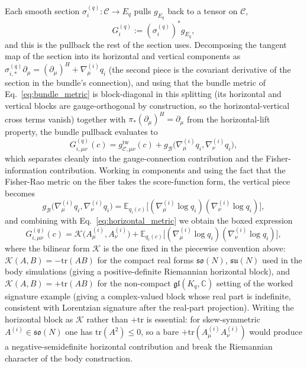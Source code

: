 \documentclass[11pt]{article}
\begin{document}
Each smooth section $\sigma_i^{(q)}: \mathcal{C} \to E_q$ pulls $g_{E_q}$ back to a tensor on $\mathcal{C}$,
\begin{equation}
G_i^{(q)} := (\sigma_i^{(q)})^* g_{E_q},
\end{equation}
and this is the pullback the rest of the section uses. Decomposing the tangent map of the section into its horizontal and vertical components as $\sigma_{i,*}^{(q)}\partial_\mu = (\partial_\mu)^H + \nabla^{(i)}_\mu q_i$ (the second piece is the covariant derivative of the section in the bundle's connection), and using that the bundle metric of Eq.~\eqref{eq:bundle_metric} is block-diagonal in this splitting (its horizontal and vertical blocks are gauge-orthogonal by construction, so the horizontal-vertical cross terms vanish) together with $\pi_*(\partial_\mu)^H = \partial_\mu$ from the horizontal-lift property, the bundle pullback evaluates to
\begin{equation}
G^{(q)}_{i,\mu\nu}(c) = g_{\mathcal{C},\mu\nu}^{\mathrm{tw}}(c) + g_{\mathcal{B}}\big(\nabla^{(i)}_\mu q_i, \nabla^{(i)}_\nu q_i\big),
\end{equation}
which separates cleanly into the gauge-connection contribution and the Fisher-information contribution. Working in components and using the fact that the Fisher-Rao metric on the fiber takes the score-function form, the vertical piece becomes
\begin{equation}
g_{\mathcal{B}}\big(\nabla^{(i)}_\mu q_i, \nabla^{(i)}_\nu q_i\big) = \mathbb{E}_{q_i(c)}\big[(\nabla^{(i)}_\mu \log q_i)(\nabla^{(i)}_\nu \log q_i)\big],
\end{equation}
and combining with Eq.~\eqref{eq:horizontal_metric} we obtain the boxed expression
\begin{equation}
\boxed{G^{(q)}_{i,\mu\nu}(c) = \mathcal{K}\big(A^{(i)}_\mu, A^{(i)}_\nu\big) + \mathbb{E}_{q_i(c)}\big[(\nabla^{(i)}_\mu \log q_i)(\nabla^{(i)}_\nu \log q_i)\big],}
\label{eq:induced_metric_full}
\end{equation}
where the bilinear form $\mathcal{K}$ is the one fixed in the piecewise convention above: $\mathcal{K}(A,B) = -\mathrm{tr}(AB)$ for the compact real forms $\mathfrak{so}(N)$, $\mathfrak{su}(N)$ used in the body simulations (giving a positive-definite Riemannian horizontal block), and $\mathcal{K}(A,B) = +\mathrm{tr}(AB)$ for the non-compact $\mathfrak{gl}(K_q, \mathbb{C})$ setting of the worked signature example (giving a complex-valued block whose real part is indefinite, consistent with Lorentzian signature after the real-part projection). Writing the horizontal block as $\mathcal{K}$ rather than $+\mathrm{tr}$ is essential: for skew-symmetric $A^{(i)} \in \mathfrak{so}(N)$ one has $\mathrm{tr}(A^2) \le 0$, so a bare $+\mathrm{tr}(A^{(i)}_\mu A^{(i)}_\nu)$ would produce a negative-semidefinite horizontal contribution and break the Riemannian character of the body construction.
\end{document}
